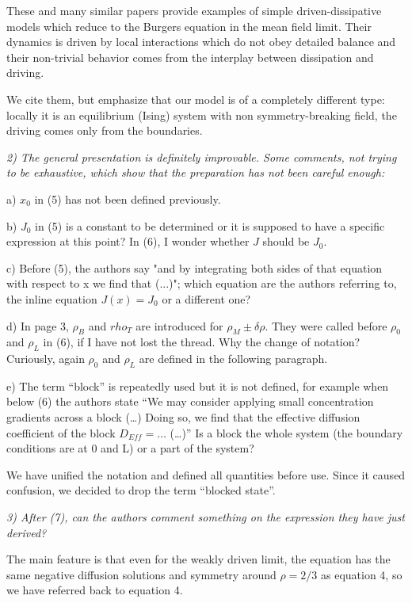 \documentclass[a4paper,10pt]{article}
\begin{document}
These and many similar papers provide examples of simple
driven-dissipative models which reduce to the Burgers equation in the
mean field limit.  Their dynamics is driven by local interactions
which do not obey detailed balance and their non-trivial behavior
comes from the interplay between dissipation and driving. 

We cite them, but emphasize that our model is of a completely
different type: locally it is an equilibrium (Ising) system with non
symmetry-breaking field, the driving comes only from the boundaries.

  {\it 
   2) The general presentation is definitely improvable. Some comments,
   not trying to be exhaustive, which show that the preparation has not
   been careful enough:
  
   a) $x_0$ in (5) has not been defined previously.
  
   b) $J_0$ in (5) is a constant to be determined or it is supposed to
   have a specific expression at this point? In (6), I wonder whether $J$
   should be $J_0$.
  
   c) Before (5), the authors say "and by integrating both sides of that
   equation with respect to x we find that (...)"; which equation are the
   authors referring to, the inline equation $J(x)=J_0$ or a different
   one?
  
   d) In page 3, $\rho_B$ and $rho_T$ are introduced for
   $\rho_M\pm\delta\rho$. They were called before $\rho_0$ and $\rho_L$
   in (6), if I have not lost the thread. Why the change of notation?
   Curiously, again $\rho_0$ and $\rho_L$ are defined in the following
   paragraph.
  
   e) The term ``block'' is repeatedly used but it is not defined, for
   example when below (6) the authors state ``We may consider applying
   small concentration gradients across a block (\dots) Doing so, we find
   that the effective diffusion coefficient of the block $D_{Eff}=\dots$
   (\dots)'' Is a block the whole system (the boundary conditions are at 0
   and L) or a part of the system?
  }

We have unified the notation and defined all quantities before use.  
Since it caused confusion, we decided to drop the term ``blocked state''.  


  {\it 3) After (7), can the authors comment something on the
    expression they have just derived?  } 

The main feature is that even for the weakly driven limit, the
equation has the same negative diffusion solutions and symmetry around
$\rho=2/3$ as equation 4, so we have referred back to equation 4.
  
\end{document}
